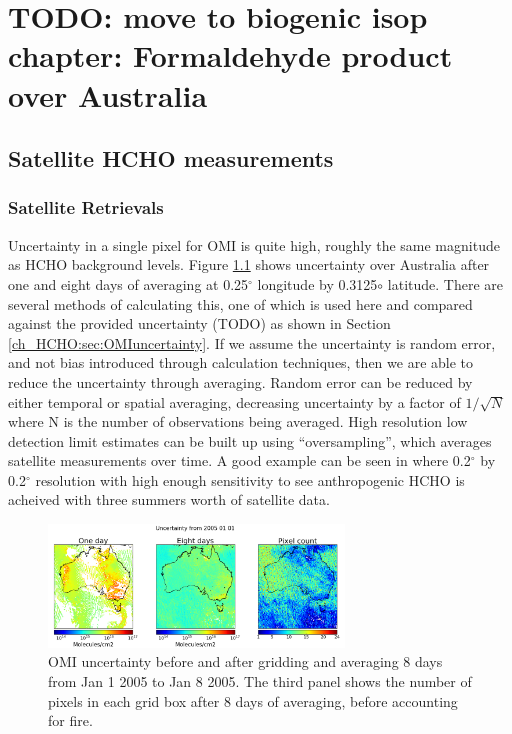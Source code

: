 
\chapter{TODO: move to biogenic isop chapter: Formaldehyde product over Australia} %
\label{ch_HCHO} %

    
\section{Satellite HCHO measurements}
\label{ch_HCHO:sec:satelliteHCHO}
  \subsection{Satellite Retrievals}
    
    
    Uncertainty in a single pixel for OMI is quite high, roughly the same magnitude as HCHO background levels.
    Figure \ref{ch_HCHO:fig:eightDayUncertainty} shows uncertainty over Australia after one and eight days of averaging at 0.25$^{\circ}$ longitude by 0.3125${\circ}$ latitude.
    There are several methods of calculating this, one of which is used here and compared against the provided uncertainty (TODO) as shown in Section \ref{ch_HCHO:sec:OMIuncertainty}.
    If we assume the uncertainty is random error, and not bias introduced through calculation techniques, then we are able to reduce the uncertainty through averaging.
    Random error can be reduced by either temporal or spatial averaging, decreasing uncertainty by a factor of $1/\sqrt{N}$ where N is the number of observations being averaged.
    High resolution low detection limit estimates can be built up using ``oversampling'', which averages satellite measurements over time.
    A good example can be seen in \cite{Zhu2014} where 0.2$^{\circ}$ by 0.2$^{\circ}$ resolution with high enough sensitivity to see anthropogenic HCHO is acheived with three summers worth of satellite data.
    
    
    \begin{figure}[!htbp]
      \includegraphics[width=0.7\textwidth]{Figures/HCHO/Uncertainty.png}
      \caption{%
	      OMI uncertainty before and after gridding and averaging 8 days from Jan 1 2005 to Jan 8 2005.
	      The third panel shows the number of pixels in each grid box after 8 days of averaging, before accounting for fire.
      }
      \label{ch_HCHO:fig:eightDayUncertainty}
    \end{figure}
  
